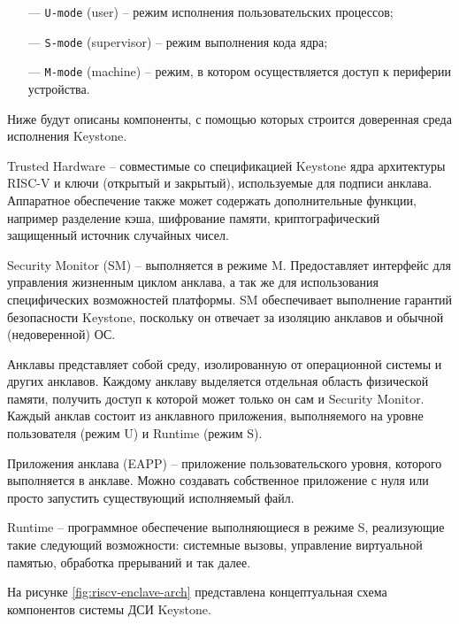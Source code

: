 \begin{itemize}
	\item [---] \texttt{U-mode} (user) -- режим исполнения пользовательских процессов;
	\item [---] \texttt{S-mode} (supervisor) -- режим выполнения кода ядра;
	\item [---] \texttt{M-mode} (machine) -- режим, в котором осуществляется доступ к периферии устройства.
\end{itemize}

Ниже будут описаны компоненты, с помощью которых строится доверенная среда исполнения Keystone.

Trusted Hardware -- совместимые со спецификацией Keystone ядра архитектуры RISC-V и ключи (открытый и закрытый), используемые для подписи анклава. Аппаратное обеспечение также может содержать дополнительные функции, например разделение кэша, шифрование памяти, криптографический защищенный источник случайных чисел.

Security Monitor (SM) -- выполняется в режиме M. Предоставляет интерфейс для управления жизненным циклом анклава, а так же для использования специфических возможностей платформы. SM обеспечивает выполнение гарантий безопасности Keystone, поскольку он отвечает за изоляцию анклавов и обычной (недоверенной) ОС. 

Анклавы представляет собой среду, изолированную от операционной системы и других анклавов. Каждому анклаву выделяется отдельная область физической памяти, получить доступ к которой может только он сам и Security Monitor. Каждый анклав состоит из анклавного приложения, выполняемого на уровне пользователя (режим  U) и Runtime (режим S).

Приложения анклава (EAPP) -- приложение пользовательского уровня, которого выполняется в анклаве. Можно создавать собственное приложение с нуля или просто запустить существующий исполняемый файл.

Runtime -- программное обеспечение выполняющиеся в режиме S, реализующие такие следующий возможности: системные вызовы, управление виртуальной памятью, обработка прерываний и так далее.

На рисунке \ref{fig:riscv-enclave-arch} представлена концептуальная схема компонентов системы ДСИ Keystone.

